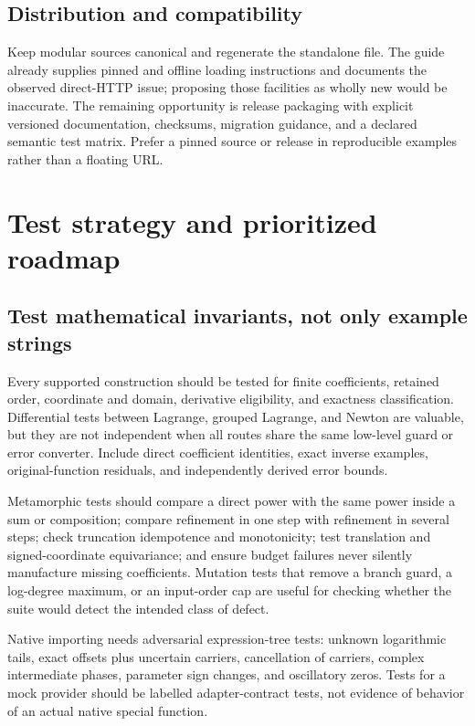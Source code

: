 \documentclass[11pt,letterpaper]{article}
\newcommand{\code}[1]{\texttt{\detokenize{#1}}}
\begin{document}
\subsection{Distribution and compatibility}
Keep modular sources canonical and regenerate the standalone file. The guide already supplies pinned and offline loading instructions and documents the observed direct-HTTP \code{Get} issue; proposing those facilities as wholly new would be inaccurate. The remaining opportunity is release packaging with explicit versioned documentation, checksums, migration guidance, and a declared semantic test matrix. Prefer a pinned source or release in reproducible examples rather than a floating \code{main} URL.\cite{guide,development,readme}

\section{Test strategy and prioritized roadmap}
\subsection{Test mathematical invariants, not only example strings}
Every supported construction should be tested for finite coefficients, retained order, coordinate and domain, derivative eligibility, and exactness classification. Differential tests between Lagrange, grouped Lagrange, and Newton are valuable, but they are not independent when all routes share the same low-level guard or error converter. Include direct coefficient identities, exact inverse examples, original-function residuals, and independently derived error bounds.\cite{incremental,arithmetic-tests}

Metamorphic tests should compare a direct power with the same power inside a sum or composition; compare refinement in one step with refinement in several steps; check truncation idempotence and monotonicity; test translation and signed-coordinate equivariance; and ensure budget failures never silently manufacture missing coefficients. Mutation tests that remove a branch guard, a log-degree maximum, or an input-order cap are useful for checking whether the suite would detect the intended class of defect.

Native importing needs adversarial expression-tree tests: unknown logarithmic tails, exact offsets plus uncertain carriers, cancellation of carriers, complex intermediate phases, parameter sign changes, and oscillatory zeros. Tests for a mock provider should be labelled adapter-contract tests, not evidence of behavior of an actual native special function.
\end{document}
